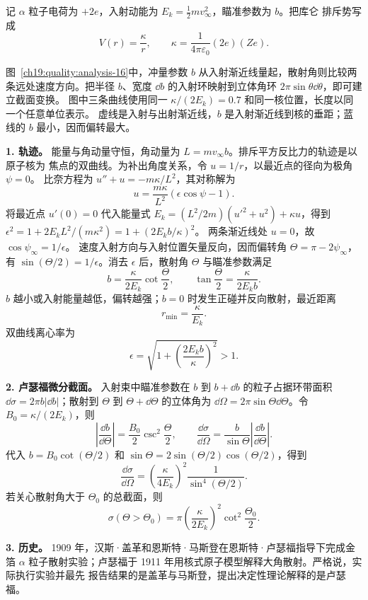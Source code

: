 \begin{xesolution}
记 $\alpha$ 粒子电荷为 $+2e$，入射动能为 $E_k=\tfrac12mv_\infty^2$，瞄准参数为 $b$。把库仑
排斥势写成
\[
  V(r)=\frac{\kappa}{r},
  \qquad
  \kappa=\frac{1}{4\pi\varepsilon_0}(2e)(Ze).
\]

\begin{qualityfigure}
\ThRutherfordAnalysisDrawing
{}\label{ch19:quality:analysis-16}
\end{qualityfigure}
图~\ref{ch19:quality:analysis-16}中，冲量参数 $b$ 从入射渐近线量起，散射角则比较两条远处速度方向。把半径 $b$、宽度 $\dd b$ 的入射环映射到立体角环 $2\pi\sin\theta\dd\theta$，即可建立截面变换。
图中三条曲线使用同一 $\kappa/(2E_k)=0.7$ 和同一核位置，长度以同一个任意单位表示。
虚线是入射与出射渐近线，$b$ 是入射渐近线到核的垂距；蓝线的 $b$ 最小，因而偏转最大。


\textbf{1. 轨迹。} 能量与角动量守恒，角动量为 $L=mv_\infty b$。排斥平方反比力的轨迹是以原子核为
焦点的双曲线。为补出角度关系，令 $u=1/r$，以最近点的径向为极角 $\psi=0$。
比奈方程为 $u''+u=-m\kappa/L^2$，其对称解为
\[
 u=\frac{m\kappa}{L^2}(\epsilon\cos\psi-1).
\]
将最近点 $u'(0)=0$ 代入能量式
$E_k=(L^2/2m)(u'^2+u^2)+\kappa u$，得到
$\epsilon^2=1+2E_kL^2/(m\kappa^2)=1+(2E_kb/\kappa)^2$。
两条渐近线处 $u=0$，故 $\cos\psi_\infty=1/\epsilon$。
速度入射方向与入射位置矢量反向，因而偏转角
$\Theta=\pi-2\psi_\infty$，有
$\sin(\Theta/2)=1/\epsilon$。消去 $\epsilon$ 后，散射角 $\Theta$ 与瞄准参数满足
\[
  \boxed{b=\frac{\kappa}{2E_k}\cot\frac\Theta2},
  \qquad
  \boxed{\tan\frac\Theta2=\frac{\kappa}{2E_kb}}.
\]
$b$ 越小或入射能量越低，偏转越强；$b=0$ 时发生正碰并反向散射，最近距离
\[
  \boxed{r_{\min}=\frac{\kappa}{E_k}}.
\]
双曲线离心率为
\[
  \epsilon=\sqrt{1+\left(\frac{2E_kb}{\kappa}\right)^2}>1.
\]

\par\Needspace{.60\textheight}
\textbf{2. 卢瑟福微分截面。} 入射束中瞄准参数在 $b$ 到 $b+\dd b$ 的粒子占据环带面积
$\dd\sigma=2\pi b|\dd b|$；散射到 $\Theta$ 到 $\Theta+\dd\Theta$ 的立体角为
$\dd\Omega=2\pi\sin\Theta\dd\Theta$。令 $B_0=\kappa/(2E_k)$，则
\[
 \left|\frac{\dd b}{\dd\Theta}\right|=\frac{B_0}{2}\csc^2\frac\Theta2,
 \qquad \frac{\dd\sigma}{\dd\Omega}=
 \frac{b}{\sin\Theta}\left|\frac{\dd b}{\dd\Theta}\right|.
\]
代入 $b=B_0\cot(\Theta/2)$ 和 $\sin\Theta=2\sin(\Theta/2)\cos(\Theta/2)$，得到
\[
  \boxed{\frac{\dd\sigma}{\dd\Omega}
  =\left(\frac{\kappa}{4E_k}\right)^2
  \frac{1}{\sin^4(\Theta/2)}}.
\]
若关心散射角大于 $\Theta_0$ 的总截面，则
\[
  \boxed{\sigma(\Theta>\Theta_0)
  =\pi\left(\frac{\kappa}{2E_k}\right)^2
  \cot^2\frac{\Theta_0}{2}}.
\]

\textbf{3. 历史。} 1909 年，汉斯·盖革和恩斯特·马斯登在恩斯特·卢瑟福指导下完成金箔
$\alpha$ 粒子散射实验；卢瑟福于 1911 年用核式原子模型解释大角散射。严格说，实际执行实验并最先
报告结果的是盖革与马斯登，提出决定性理论解释的是卢瑟福。
\end{xesolution}

\endgroup

\endgroup
